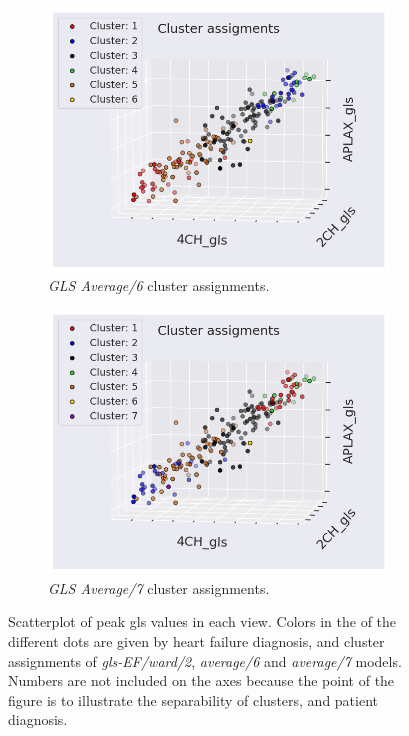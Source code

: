\begin{figure}[H]
\begin{subfigure}[b]{0.49\textwidth}
        \label{fig:scatter_gls_ef_ward2_ind}
    \end{subfigure}\\
    \begin{subfigure}[b]{0.49\textwidth}
        \centering
        \includegraphics[width=0.99\textwidth]{results/pd/scatter_gls_average6.png}
        \caption{\textit{GLS Average/6} cluster assignments.}
        \label{fig:scatter_gls_average6}
    \end{subfigure}
    \begin{subfigure}[b]{0.49\textwidth}
        \centering
        \includegraphics[width=0.99\textwidth]{results/pd/scatter_gls_average7.png}
        \caption{\textit{GLS Average/7} cluster assignments.}
        \label{fig:scatter_gls_average7}
    \end{subfigure}
    \caption{Scatterplot of peak \acrshort{gls} values in each view. Colors in the of the different dots are given by heart failure diagnosis, and cluster assignments of 
             \textit{gls-EF/ward/2}, \textit{average/6} and \textit{average/7} models. Numbers are not included on the axes because the point of the figure is to illustrate the separability 
             of clusters, and patient diagnosis.}
             \label{fig:scatter_gls_ind_cluster_assignments}
\end{figure}

